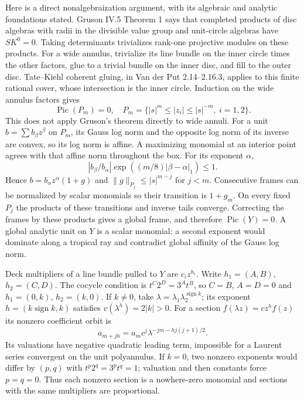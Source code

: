 \documentclass[11pt]{article}
\theoremstyle{remark}\newtheorem{remark}[theorem]{Remark}
\begin{document}
Here is a direct nonalgebraization argument, with its algebraic and
analytic foundations stated. Gruson IV.5 Theorem 1 says that completed
products of disc algebras with radii in the divisible value group and
unit-circle algebras have $SK^0=0$. Taking determinants trivializes
rank-one projective modules on these products. For a wide annulus,
trivialize its line bundle on the inner circle times the other factors,
glue to a trivial bundle on the inner disc, and fill to the outer disc.
Tate--Kiehl coherent gluing, in Van der Put 2.14--2.16.3, applies to this
finite rational cover, whose intersection is the inner circle. Induction
on the wide annulus factors gives
\[
\operatorname{Pic}(P_m)=0,
\quad P_m=\{|s|^m\le |z_i|\le |s|^{-m},\ i=1,2\}.
\]
This does not apply Gruson's theorem directly to wide annuli.
For a unit $b=\sum b_\beta z^\beta$ on $P_m$, its Gauss log norm and
the opposite log norm of its inverse are convex, so its log norm is
affine. A maximizing monomial at an interior point agrees with that
affine norm throughout the box. For its exponent $\alpha$,
\[
|b_\beta/b_\alpha|\exp((m/8)|\beta-\alpha|_1)\le1.
\]
Hence $b=b_\alpha z^\alpha(1+g)$ and
$\|g\|_{P_j}\le |s|^{m-j}$ for $j<m$. Consecutive frames can be
normalized by scalar monomials so their transition is $1+g_m$.
On every fixed $P_j$ the products of these transitions and inverse tails
converge. Correcting the frames by these products gives a global frame,
and therefore $\operatorname{Pic}(Y)=0$. A global analytic unit on $Y$
is a scalar monomial: a second exponent would dominate along a tropical
ray and contradict global affinity of the Gauss log norm.

Deck multipliers of a line bundle pulled to $Y$ are $c_i z^{h_i}$.
Write $h_1=(A,B)$, $h_2=(C,D)$. The cocycle condition is
$t^C2^D=3^At^B$, so $C=B$, $A=D=0$ and
$h_1=(0,k)$, $h_2=(k,0)$. If $k\ne0$, take
$\lambda=\lambda_1\lambda_2^{\operatorname{sign}k}$; its exponent
$h=(k\operatorname{sign}k,k)$ satisfies $v(\lambda^h)=2|k|>0$.
For a section $f(\lambda z)=cz^hf(z)$ its nonzero coefficient orbit is
\[
a_{m+jh}=a_m c^j\lambda^{-jm-hj(j+1)/2}.
\]
Its valuations have negative quadratic leading term, impossible for a
Laurent series convergent on the unit polyannulus. If $k=0$, two nonzero
exponents would differ by $(p,q)$ with $t^p2^q=3^pt^q=1$;
valuation and then constants force $p=q=0$. Thus each nonzero section
is a nowhere-zero monomial and sections with the same multipliers are
proportional.
\end{document}
